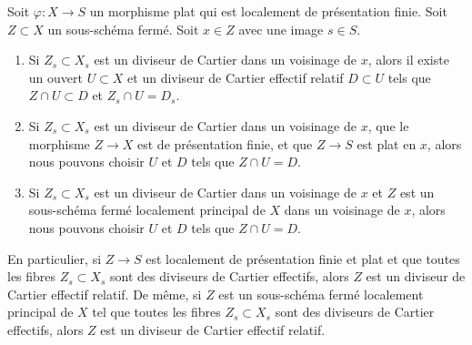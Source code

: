 \begin{lemma}
\label{lemma-fibre-Cartier}
Soit  $\varphi : X \to S$  un morphisme plat qui est localement de présentation finie. Soit
 $Z \subset X$  un sous-schéma fermé. Soit  $x \in Z$  avec une image  $s \in S$.
\begin{enumerate}
\item Si  $Z_s \subset X_s$  est un diviseur de Cartier dans un voisinage de  $x$,
alors il existe un ouvert  $U \subset X$  et un diviseur de Cartier effectif relatif
 $D \subset U$  tels que  $Z \cap U \subset D$  et  $Z_s \cap U = D_s$.
\item Si  $Z_s \subset X_s$  est un diviseur de Cartier dans un voisinage de  $x$, que
le morphisme  $Z \to X$  est de présentation finie, et que  $Z \to S$  est plat
en  $x$, alors nous pouvons choisir  $U$  et  $D$  tels que
 $Z \cap U = D$.
\item Si  $Z_s \subset X_s$  est un diviseur de Cartier dans un voisinage de  $x$  et
 $Z$  est un sous-schéma fermé localement principal de  $X$  dans un
voisinage de  $x$, alors nous pouvons choisir  $U$  et  $D$ 
tels que  $Z \cap U = D$.
\end{enumerate}
En particulier, si  $Z \to S$  est localement de présentation finie et plat et
que toutes les fibres  $Z_s \subset X_s$  sont des diviseurs de Cartier effectifs, alors
 $Z$  est un diviseur de Cartier effectif relatif. De même, si  $Z$ 
est un sous-schéma fermé localement principal de  $X$  tel que toutes les
fibres  $Z_s \subset X_s$  sont des diviseurs de Cartier effectifs, alors  $Z$ 
est un diviseur de Cartier effectif relatif.
\end{lemma}

